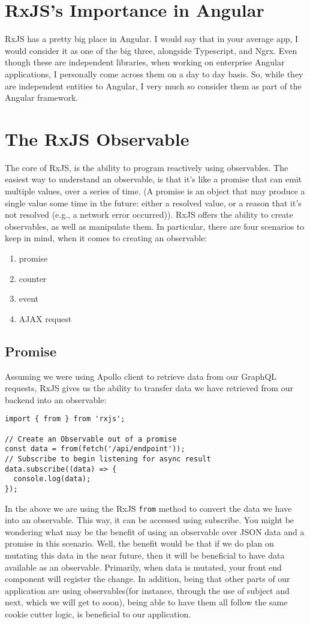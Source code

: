 \section{ RxJS's Importance in Angular }
RxJS has a pretty big place in Angular. I would say that in your average app, 
I would consider it as one of the big three, alongside Typescript, and Ngrx. 
Even though these are independent libraries, when working on enterprise Angular
applications, I personally come across them on a day to day basis. So, while 
they are independent entities to Angular, I very much so consider them as part 
of the Angular framework. 

\section{ The RxJS Observable }
The core of RxJS, is the ability to program reactively using observables. The
easiest way to understand an observable, is that it's like a promise that can
emit multiple values, over a series of time. (A promise is an object that may
produce a single value some time in the future: either a resolved value, or a
reason that it's not resolved (e.g., a network error occurred)). RxJS offers 
the ability to create observables, as well as manipulate them. In particular,
there are four scenarios to keep in mind, when it comes to creating an observable: 
\begin{enumerate}
  \item promise
  \item counter
  \item event
  \item AJAX request
\end{enumerate}

\subsection{ Promise }
Assuming we were using Apollo client to retrieve data from our GraphQL 
requests, RxJS gives us the ability to transfer data we have retrieved from our
backend into an observable: 
\begin{lstlisting}
import { from } from 'rxjs';

// Create an Observable out of a promise
const data = from(fetch('/api/endpoint'));
// Subscribe to begin listening for async result
data.subscribe((data) => {
  console.log(data);
});  
\end{lstlisting}

In the above we are using the RxJS \lstinline{from} method to convert the data we
have into an observable. This way, it can be accessed using subscribe. You 
might be wondering what may be the benefit of using an observable over JSON 
data and a promise in this scenario. Well, the benefit would be that if we do
plan on mutating this data in the near future, then it will be beneficial to 
have data available as an observable. Primarily, when data is mutated, your 
front end component will register the change. In addition, being that other 
parts of our application are using observables(for instance, through the use 
of subject and next, which we will get to soon), being able to have them all 
follow the same cookie cutter logic, is beneficial to our application.

